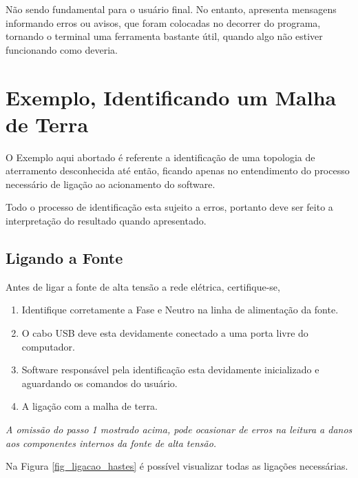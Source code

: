 \documentclass[a4paper, 10pt]{article}
\begin{document}
Não sendo fundamental para o usuário final. No entanto, apresenta mensagens informando erros ou avisos,
que foram colocadas no decorrer do programa, tornando o terminal uma ferramenta bastante útil, 
quando algo não estiver funcionando como deveria.

\section{Exemplo, Identificando um Malha de Terra}

O Exemplo aqui abortado é referente a identificação de uma topologia de aterramento
desconhecida até então, ficando apenas no entendimento do processo necessário de 
ligação ao acionamento do software.

Todo o processo de identificação esta sujeito a erros, portanto deve ser feito a 
interpretação do resultado quando apresentado.

\subsection{Ligando a Fonte}

Antes de ligar a fonte de alta tensão a rede elétrica, certifique-se,

\begin{enumerate}
    \item Identifique corretamente a Fase e Neutro na linha de alimentação da fonte.
    \item O cabo USB deve esta devidamente conectado a uma porta livre do computador.
    \item Software responsável pela identificação esta devidamente inicializado e aguardando
        os comandos do usuário.
    \item A ligação com a malha de terra. 
\end{enumerate}

\textit{A omissão do passo 1 mostrado acima, pode ocasionar de erros na leitura a 
danos aos componentes internos da fonte de alta tensão.}

Na Figura \ref{fig_ligacao_hastes} é possível visualizar todas as ligações necessárias.
\end{document}
